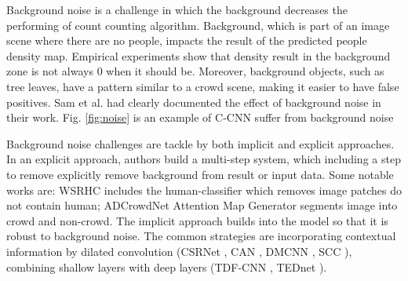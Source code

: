 Background noise is a challenge in which the background
decreases the performing of count counting algorithm.
Background, which is part of an image scene where there are
no people, impacts the result of the predicted people density
map. Empirical experiments show that density result in the
background zone is not always 0 when it should be. Moreover,
background objects, such as tree leaves, have a pattern similar
to a crowd scene, making it easier to have false positives. Sam et
al. \cite{DBLPconfaaaiSamB18} had clearly documented the effect of background noise in
their work. Fig. \ref{fig:noise} is an example of C-CNN \cite{9053780} suffer from background noise

Background noise challenges are tackle by both implicit and explicit approaches. In an explicit approach, authors build a multi-step system, which including a step to remove explicitly remove background from result or input data. Some notable works are: WSRHC \cite{10.1145/3287921.3287980} includes the human-classifier which removes image patches do not contain human; ADCrowdNet \cite{liu2019adcrowdnet} Attention Map Generator segments image into crowd and non-crowd. The implicit approach builds into the model so that it is robust to background noise. The common strategies are incorporating contextual information by dilated convolution (CSRNet \cite{li2018csrnet}, CAN \cite{liu2019context}, DMCNN \cite{zhang2019crowd}, SCC \cite{9023874}), combining shallow layers with deep layers (TDF-CNN \cite{DBLPconfaaaiSamB18}, TEDnet \cite{jiang2019crowd}).


